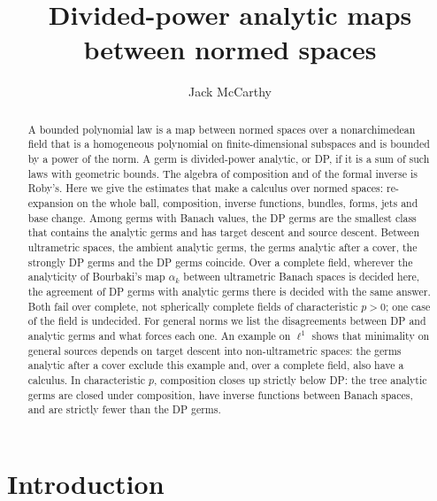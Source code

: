 \documentclass[11pt]{amsart}
\title{Divided-power analytic maps between normed spaces}
\author{Jack McCarthy}
\theoremstyle{definition}
\theoremstyle{remark}
\numberwithin{equation}{section}
\theoremstyle{plain}
\theoremstyle{definition}
\theoremstyle{plain}
\begin{document}
\begin{abstract}
A bounded polynomial law is a map between normed spaces over a nonarchimedean field that is a homogeneous polynomial on
finite-dimensional subspaces and is bounded by a power of the norm. A germ is divided-power analytic, or DP, if it is a
sum of such laws with geometric bounds. The algebra of composition and of the formal inverse is Roby's. Here we give the
estimates that make a calculus over normed spaces: re-expansion on the whole ball, composition, inverse functions,
bundles, forms, jets and base change. Among germs with Banach values, the DP germs are the smallest class that contains
the analytic germs and has target descent and source descent. Between ultrametric spaces, the ambient analytic germs, the
germs analytic after a cover, the strongly DP germs and the DP germs coincide. Over a complete field, wherever the
analyticity of Bourbaki's map $\alpha_k$ between ultrametric Banach spaces is decided here, the agreement of DP germs with
analytic germs there is decided with the same answer. Both fail over complete, not spherically complete fields of
characteristic $p>0$; one case of the field is undecided. For general norms we list the disagreements between DP and
analytic germs and what forces each one. An example on $\ell^1$ shows that minimality on general sources depends on target
descent into non-ultrametric spaces: the germs analytic after a cover exclude this example and, over a complete field, also have a calculus. In
characteristic $p$, composition closes up strictly below DP: the tree analytic germs are closed under composition, have
inverse functions between Banach spaces, and are strictly fewer than the DP germs.
\end{abstract}
\maketitle
\setcounter{tocdepth}{1}
\begingroup
\small
\linespacing=8pt
\tableofcontents\removelastskip
\endgroup
\clearpage
\section{Introduction}\label{dp:sec:intro}
\end{document}
